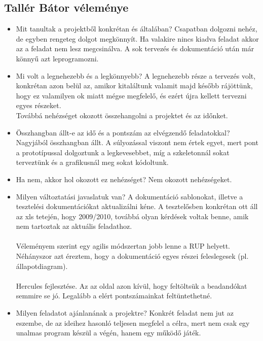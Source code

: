 \subsection{Tallér Bátor véleménye}
\begin{itemize}
\item Mit tanultak a projektből konkrétan és általában? \newline
Csapatban dolgozni nehéz, de egyben rengeteg dolgot megkönnyít. Ha valakire nincs kiadva feladat akkor az a feladat nem lesz megcsinálva. A sok tervezés és dokumentáció után már könnyű azt leprogramozni.
\item Mi volt a legnehezebb és a legkönnyebb? \newline
A legnehezebb része a tervezés volt, konkrétan azon belül az, amikor kitaláltunk valamit majd később rájöttünk, hogy ez valamilyen ok miatt mégse megfelelő, és ezért újra kellett tervezni egyes részeket.\\
Továbbá nehézséget okozott összehangolni a projektet és az időnket.
\item Összhangban állt-e az idő és a pontszám az elvégzendő feladatokkal? \newline
Nagyjából összhangban állt. A súlyozással viszont nem értek egyet, mert pont a prototípussal dolgoztunk a legkevesebbet, míg a szkeletonnál sokat terveztünk és a grafikusnál meg sokat kódoltunk.\\
\item Ha nem, akkor hol okozott ez nehézséget? \newline
Nem okozott nehézségeket.
\item Milyen változtatási javaslatuk van? \newline
A dokumentáció sablonokat, illetve a tesztelési dokumentációkat aktualizálni kéne. A tesztelősben konkrétan ott áll az xls tetején, hogy 2009/2010, továbbá olyan kérdések voltak benne, amik nem tartoztak az aktuális feladathoz.\\\\
Véleményem szerint egy agilis módszertan jobb lenne a RUP helyett. Néhányszor azt éreztem, hogy a dokumentáció egyes részei feleslegesek (pl. állapotdiagram).\\\\
Hercules fejlesztése. Az az oldal azon kívül, hogy feltöltsük a beadandókat semmire se jó. Legalább a elért pontszámainkat feltüntethetné.
\item Milyen feladatot ajánlanának a projektre? \newline
Konkrét feladat nem jut az eszembe, de az ideihez hasonló teljesen megfelel a célra, mert nem csak egy unalmas program készül a végén, hanem egy működő játék.
\end{itemize}


